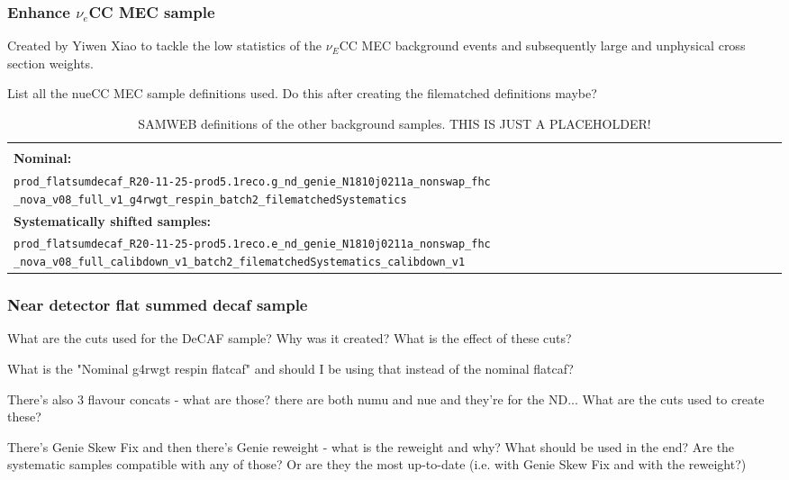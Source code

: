 \documentclass[12pt]{article}
\begin{document}
\subsubsection*{Enhance $\nu_e$CC MEC sample}
Created by Yiwen Xiao \cite{NOVA-doc-56383} to tackle the low statistics of the $\nu_E$CC MEC background events and subsequently large and unphysical cross section weights.

List all the nueCC MEC sample definitions used. Do this after creating the filematched definitions maybe?

\begin{table}[!ht]
\centering
\begin{tabular}{p{\textwidth}}
\hline\hline\\
\textbf{Nominal:}\\
\texttt{prod\_flatsumdecaf\_R20-11-25-prod5.1reco.g\_nd\_genie\_N1810j0211a\_nonswap\_fhc} \texttt{\_nova\_v08\_full\_v1\_g4rwgt\_respin\_batch2\_filematchedSystematics}\\[2mm]
\textbf{Systematically shifted samples:}\\
\texttt{prod\_flatsumdecaf\_R20-11-25-prod5.1reco.e\_nd\_genie\_N1810j0211a\_nonswap\_fhc} \texttt{\_nova\_v08\_full\_calibdown\_v1\_batch2\_filematchedSystematics\_calibdown\_v1}\\[2mm]
\hline\hline
\end{tabular}
\caption{SAMWEB definitions of the other background samples. THIS IS JUST A PLACEHOLDER!}
\label{tab:NueCCMECDefinitions}
\end{table}

\subsubsection*{Near detector flat summed decaf sample}
What are the cuts used for the DeCAF sample? Why was it created? What is the effect of these cuts?

What is the "Nominal g4rwgt respin flatcaf" and should I be using that instead of the nominal flatcaf?

There's also 3 flavour concats - what are those? there are both numu and nue and they're for the ND... What are the cuts used to create these?

There's Genie Skew Fix and then there's Genie reweight  - what is the reweight and why? What should be used in the end? Are the systematic samples compatible with any of those? Or are they the most up-to-date (i.e. with Genie Skew Fix and with the reweight?)
\end{document}
